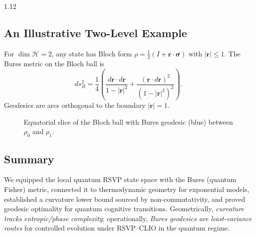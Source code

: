 \documentclass[12pt,a4paper]{article}
\numberwithin{equation}{section}
\theoremstyle{remark}
\theoremstyle{definition}
\begin{document}
\begin{spacing}{1.12}
\subsection{An Illustrative Two-Level Example}\label{sec:E-bloch}

For $\dim\mathcal{H}=2$, any state has Bloch form $\rho=\tfrac{1}{2}(I+\mathbf{r}\cdot\bm{\sigma})$ with $|\mathbf{r}|\le 1$. The Bures metric on the Bloch ball is
\[
ds_B^2 = \frac{1}{4}\left(\frac{d\mathbf{r}\cdot d\mathbf{r}}{1-|\mathbf{r}|^2} + \frac{(\mathbf{r}\cdot d\mathbf{r})^2}{(1-|\mathbf{r}|^2)^2}\right).
\]
Geodesics are arcs orthogonal to the boundary $|\mathbf{r}|=1$.

\begin{figure}[h]
\centering
{}
\caption{Equatorial slice of the Bloch ball with Bures geodesic (blue) between $\rho_0$ and $\rho_1$.}
\label{fig:E-bloch}
\end{figure}

\subsection{Summary}\label{sec:E-summary}

We equipped the local quantum RSVP state space with the Bures (quantum Fisher) metric, connected it to thermodynamic geometry for exponential models, established a curvature lower bound sourced by non-commutativity, and proved geodesic optimality for quantum cognitive transitions. Geometrically, \emph{curvature tracks entropic/phase complexity}; operationally, \emph{Bures geodesics are least-variance routes} for controlled evolution under RSVP--CLIO in the quantum regime.


\linespread{1.05}
\setlength{\parindent}{0pt}


\end{spacing}
\end{document}

